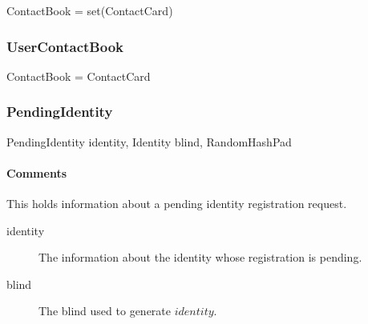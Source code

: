 \documentclass[a4paper,10pt]{article}
\begin{document}
\begin{verbbox}
ContactBook = set(ContactCard)
\end{verbbox}
\begin{center}
\theverbbox
\end{center}

\begin{inparaitem}[ ]
 \item \persistent
 \item \secure
 \item \unique
\end{inparaitem}

\subsubsection{UserContactBook}

\begin{verbbox}
ContactBook = ContactCard
\end{verbbox}
\begin{center}
\theverbbox
\end{center}

\begin{inparaitem}[ ]
 \item \persistent
 \item \secure
 \item \unique
\end{inparaitem}

\subsubsection{PendingIdentity}

\begin{verbbox}
PendingIdentity
{
  identity, Identity
  blind, RandomHashPad
}
\end{verbbox}
\begin{center}
\theverbbox
\end{center}

\begin{inparaitem}[ ]
 \item \infrastructure
\end{inparaitem}

\paragraph*{Comments}
This holds information about a pending identity registration request.

\SpecialItem
\begin{description}
 \item[identity] The information about the identity whose registration is pending.
 \item[blind] The blind used to generate $identity$.
\end{description}
\end{document}
